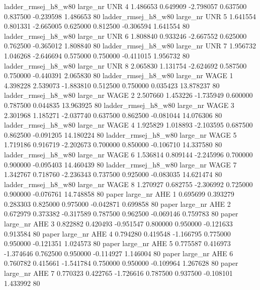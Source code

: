 ladder_rmsej_h8_w80   large_nr      UNR                 4  1.486653  0.649909  -2.798057 0.637500 0.837500 -0.239598    1.486653 80
ladder_rmsej_h8_w80   large_nr      UNR                 5  1.641554  0.801331  -2.665005 0.625000 0.812500 -0.306594    1.641554 80
ladder_rmsej_h8_w80   large_nr      UNR                 6  1.808840  0.933246  -2.667552 0.625000 0.762500 -0.365012    1.808840 80
ladder_rmsej_h8_w80   large_nr      UNR                 7  1.956732  1.046268  -2.646694 0.575000 0.750000 -0.411015    1.956732 80
ladder_rmsej_h8_w80   large_nr      UNR                 8  2.065830  1.131754  -2.624692 0.587500 0.750000 -0.440391    2.065830 80
ladder_rmsej_h8_w80   large_nr     WAGE                 1  4.398228  2.539073  -1.883810 0.512500 0.750000  0.035423   13.878237 80
ladder_rmsej_h8_w80   large_nr     WAGE                 2  2.507660  1.453226  -1.735949 0.600000 0.787500  0.044835   13.963925 80
ladder_rmsej_h8_w80   large_nr     WAGE                 3  2.301968  1.185271  -2.037740 0.637500 0.862500 -0.081044   14.076306 80
ladder_rmsej_h8_w80   large_nr     WAGE                 4  1.925829  1.018893  -2.103595 0.687500 0.862500 -0.091205   14.180224 80
ladder_rmsej_h8_w80   large_nr     WAGE                 5  1.719186  0.916719  -2.202673 0.700000 0.850000 -0.106710   14.337580 80
ladder_rmsej_h8_w80   large_nr     WAGE                 6  1.536814  0.809144  -2.245996 0.700000 0.900000 -0.095403   14.460439 80
ladder_rmsej_h8_w80   large_nr     WAGE                 7  1.342767  0.718760  -2.236343 0.737500 0.925000 -0.083035   14.621474 80
ladder_rmsej_h8_w80   large_nr     WAGE                 8  1.270927  0.682755  -2.306992 0.725000 0.900000 -0.076761   14.748858 80
              paper   large_nr      AHE                 1  0.695699  0.393279   0.283303 0.825000 0.975000 -0.042871    0.699858 80
              paper   large_nr      AHE                 2  0.672979  0.373382  -0.317589 0.787500 0.962500 -0.069146    0.759783 80
              paper   large_nr      AHE                 3  0.822882  0.420493  -0.951547 0.800000 0.950000 -0.121633    0.913584 80
              paper   large_nr      AHE                 4  0.794280  0.419548  -1.166795 0.775000 0.950000 -0.121351    1.024573 80
              paper   large_nr      AHE                 5  0.775587  0.416973  -1.374646 0.762500 0.950000 -0.114927    1.146004 80
              paper   large_nr      AHE                 6  0.760782  0.415661  -1.541784 0.750000 0.950000 -0.109964    1.267628 80
              paper   large_nr      AHE                 7  0.770323  0.422765  -1.726616 0.787500 0.937500 -0.108101    1.433992 80
